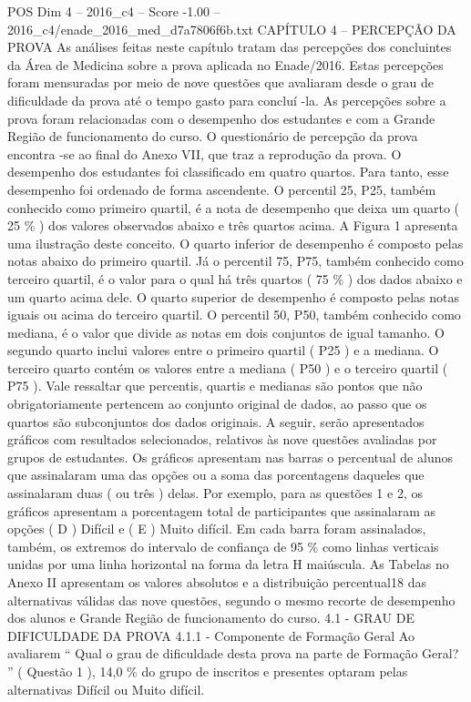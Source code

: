 \begin{textsample}{POS Dim 4 – 2016\_c4 – Score -1.00 – 2016\_c4/enade\_2016\_med\_d7a7806f6b.txt}  \label{ex:f4_pos_233}
CAPÍTULO 4 – PERCEPÇÃO DA PROVA As análises feitas neste capítulo tratam das percepções dos concluintes da Área de Medicina sobre a prova aplicada no Enade/2016.
Estas percepções foram mensuradas por meio de nove questões que avaliaram desde o grau de dificuldade da prova até o tempo gasto para concluí -la.
As percepções sobre a prova foram relacionadas com o desempenho dos estudantes e com a Grande Região de funcionamento do curso.
O questionário de percepção da prova encontra -se ao final do Anexo VII, que traz a reprodução da prova.
O desempenho dos estudantes foi classificado em quatro quartos.
Para tanto, esse desempenho foi ordenado de forma ascendente.
O percentil 25, P25, também conhecido como primeiro quartil, é a nota de desempenho que deixa um quarto ( 25 \% ) dos valores observados abaixo e três quartos acima.
A Figura 1 apresenta uma ilustração deste conceito.
O quarto inferior de desempenho é composto pelas notas abaixo do primeiro quartil.
Já o percentil 75, P75, também conhecido como terceiro quartil, é o valor para o qual há três quartos ( 75 \% ) dos dados abaixo e um quarto acima dele.
O quarto superior de desempenho é composto pelas notas iguais ou acima do terceiro quartil.
O percentil 50, P50, também conhecido como mediana, é o valor que divide as notas em dois conjuntos de igual tamanho.
O segundo quarto inclui valores entre o primeiro quartil ( P25 ) e a mediana.
O terceiro quarto contém os valores entre a mediana ( P50 ) e o terceiro quartil ( P75 ).
Vale ressaltar que percentis, quartis e medianas são pontos que não obrigatoriamente pertencem ao conjunto original de dados, ao passo que os quartos são subconjuntos dos dados originais.
A seguir, serão apresentados gráficos com resultados selecionados, relativos às nove questões avaliadas por grupos de estudantes.
Os gráficos apresentam nas barras o percentual de alunos que assinalaram uma das opções ou a soma das porcentagens daqueles que assinalaram duas ( ou três ) delas.
Por exemplo, para as questões 1 e 2, os gráficos apresentam a porcentagem total de participantes que assinalaram as opções ( D ) Difícil e ( E ) Muito difícil.
Em cada barra foram assinalados, também, os extremos do intervalo de confiança de 95 \% como linhas verticais unidas por uma linha horizontal na forma da letra H maiúscula.
As Tabelas no Anexo II apresentam os valores absolutos e a distribuição percentual18 das alternativas válidas das nove questões, segundo o mesmo recorte de desempenho dos alunos e Grande Região de funcionamento do curso. 4.1 - GRAU DE DIFICULDADE DA PROVA 4.1.1 - Componente de Formação Geral Ao avaliarem “ Qual o grau de dificuldade desta prova na parte de Formação Geral? ” ( Questão 1 ), 14,0 \% do grupo de inscritos e presentes optaram pelas alternativas Difícil ou Muito difícil.

\end{textsample}
